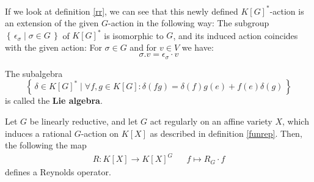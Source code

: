 \begin{remark}
  If we look at definition \ref{rr}, we can see that this newly defined $K[G]^\ast$-action is an extension of the given $G$-action in the following way:
  The subgroup $\left\{\, \epsilon_\sigma \mid \sigma \in G \,\right\}$ of $K[G]^\ast$ is isomorphic to $G$, and its induced action coincides with the given action:
  For $\sigma \in G$ and for $v \in V$ we have:
  \begin{equation}
    \sigma . v = \epsilon_\sigma \cdot v
  \end{equation}
\end{remark}

\begin{remark}
  The subalgebra
  \begin{equation}
    \left\{\, \delta \in K[G]^\ast \mid \forall f,g \in K[G] : \delta (fg) = \delta (f) g(e) + f(e)\delta (g) \,\right\}
  \end{equation}
  is called the \textbf{Lie algebra}.
\end{remark}

\begin{theorem}\label{ro}
  Let $G$ be linearly reductive, and let $G$ act regularly on an affine variety $X$, which induces a rational $G$-action on $K[X]$ as described in definition \ref{funrep}.
  Then, the following the map
  \begin{align}
    R \colon K[X] \longrightarrow K[X]^G && f \mapsto R_G \cdot f
  \end{align}
  defines a Reynolds operator.
\end{theorem}

